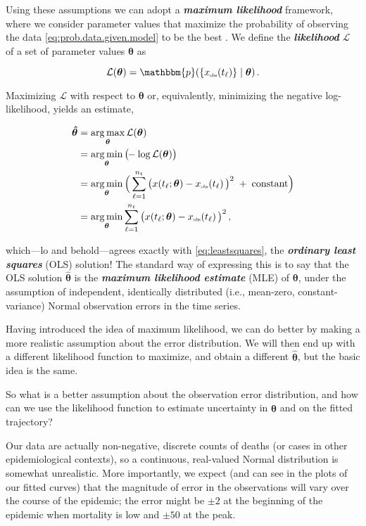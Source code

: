 \documentclass[]{interact}\usepackage[]{graphicx}\usepackage[]{xcolor}
\theoremstyle{plain}%
\theoremstyle{definition}
\theoremstyle{remark}
\newcommand{\term}[1]{{\bfseries\slshape#1}}
\newcommand{\thetavec}{{\bm{\theta}}}
\newcommand{\thetavechat}{{\bm{\hat\theta}}}
\newcommand{\pdens}{{\mathbbm{p}}} %
\newcommand{\lik}{{\mathcal L}}
\DeclareMathOperator*{\argmax}{arg\,max}
\DeclareMathOperator*{\argmin}{arg\,min}
\newcommand{\traj}{x}
\newcommand{\tindex}{{\ell}}
\newcommand{\ti}{t_\tindex}
\newcommand{\tindexmax}{{n_t}}
\newcommand{\trajobssymbol}{\traj_{{\rm{\color{black}\scalebox{0.5}{obs}}}}}
\newcommand{\trajobs}[1]{\trajobssymbol\!\left(#1\right)}
\newcommand{\trajobsti}{\trajobs{\ti}}
\begin{document}
Using these assumptions we can adopt a \term{maximum likelihood}
framework, where we consider parameter values that maximize the
probability of observing the data \eqref{eq:prob.data.given.model} to
be the best \citep{Bolk08}.  We define the \term{likelihood} $\lik$ of
a set of parameter values $\thetavec$ as
\begin{linenomath*}
\begin{equation}\label{eq:lik}
\lik(\thetavec)
= \pdens (\{\trajobsti\} \mid \thetavec) \,.
\end{equation}
\end{linenomath*}
Maximizing $\lik$ with respect to $\thetavec$ or, equivalently,
minimizing the negative log-likelihood,
yields an estimate,
\begin{linenomath*}
\begin{subequations}\label{eq:negloglik}
\begin{align}
\thetavechat
&= \argmax_\thetavec \lik(\thetavec) \\
&= \argmin_\thetavec \big(\!\!-\log{\lik(\thetavec)}\big) \\
&= \argmin_\thetavec\Big(
\sum_{\tindex=1}^{\tindexmax} \big(\traj(\ti;\thetavec) - \trajobsti\big)^2
\;+\; \text{constant}
\Big) \\
&= \argmin_\thetavec\sum_{\tindex=1}^{\tindexmax} \big(\traj(\ti;\thetavec) - \trajobsti\big)^2
 \,,
\end{align}
\end{subequations}
\end{linenomath*}
which---lo and behold---agrees exactly with \eqref{eq:leastsquares},
the \term{ordinary least squares} (OLS)
solution!
The standard way of expressing this is to
say that the OLS
solution $\thetavechat$ is the
\term{maximum likelihood estimate} (MLE) of $\thetavec$, under the
assumption of independent, identically distributed
(i.e., mean-zero, constant-variance) Normal observation errors in the time series.

Having introduced the idea of maximum likelihood, we can do better by
making a more realistic assumption about the error distribution.  We
will then end up with a different likelihood function to maximize, and
obtain a different $\thetavechat$, but the basic idea is the same.

So what is a better assumption about the observation error
distribution, and how can we use the likelihood function to estimate
uncertainty in $\thetavechat$ and on the fitted trajectory?

Our data are actually non-negative, discrete counts of deaths (or
cases in other epidemiological contexts),
so a continuous, real-valued Normal distribution is
somewhat unrealistic. More importantly, we expect (and can see
in the plots of our fitted curves) that the
magnitude of error in the observations will vary over the course of
the epidemic; the error might be $\pm 2$ at the beginning of the
epidemic when mortality is low and $\pm 50$ at the peak.
\end{document}

